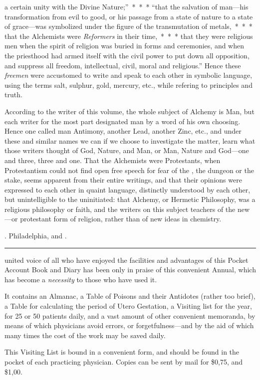 a certain unity with the Divine Nature;''~*~*~* ``that the salvation
of man---his transformation from evil to good, or his passage from
a state of nature to a state of grace---was symbolized under the figure
of the transmutation of metals,~*~*~* that the Alchemists were
\emph{Reformers} in their time,~*~*~* that they were religious men when
the spirit of religion was buried in forms and ceremonies, and when
the priesthood had armed itself with the civil power to put down all
opposition, and suppress all freedom, intellectual, civil, moral and religious.''
Hence these \emph{freemen} were accustomed to write and speak
to each other in symbolic language, using the terms salt, sulphur, gold,
mercury, etc., while refering to principles and truth.

According to the writer of this volume, the whole subject of Alchemy
is Man, but each writer for the most part designated man by a word of
his own choosing. Hence one called man Antimony, another Lead,
another Zinc, etc., and under these and similar names we can if we
choose to investigate the matter, learn what those writers thought of
God, Nature, and Man, or Man, Nature and God---one and three, three
and one. That the Alchemists were Protestants, when Protestantism
could not find open free speech for fear of the , the dungeon
or the stake, seems apparent from their entire writings, and that their
opinions were expressed to each other in quaint language, distinctly
understood by each other, but unintelligible to the uninitiated: that
Alchemy, or Hermetic Philosophy, was a religious philosophy or faith,
and the writers on this subject teachers of the new---or protestant form
of religion, rather than of new ideas in chemistry.

\smallornament
\footnotesize
{}. Philadelphia,
 and .
\plainbreak{1}
\normalsize


 united voice of all who have enjoyed the facilities and advantages
of this Pocket Account Book and Diary has been only in praise
of this convenient Annual, which has become a \emph{necessity} to those who
have used it.

It contains an Almanac, a Table of Poisons and their Antidotes
(rather too brief), a Table for calculating the period of Utero Gestation,
a Visiting list for the year, for 25 or 50 patients daily, and a vast
amount of other convenient memoranda, by means of which physicians
avoid errors, or forgetfulness---and by the aid of which many times
the cost of the work may be saved daily.

This Visiting List is bound in a convenient form, and should be found
in the pocket of each practicing physician. Copies can be sent by mail
for \$0,75, and \$1,00.\endinput
